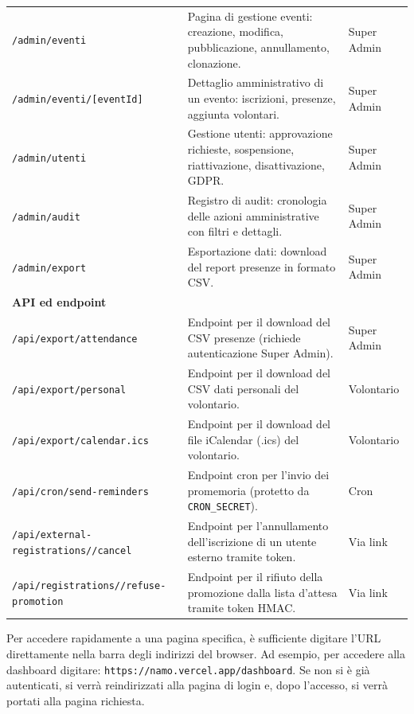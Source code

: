 \documentclass[a4paper,11pt,oneside]{book}
\newcommand{\percorso}[1]{\textcolor{namoCyan}{\texttt{#1}}}
\begin{document}
\begin{longtable}{l p{7cm} l}
\midrule
\percorso{/admin/eventi} & Pagina di gestione eventi: creazione, modifica, pubblicazione, annullamento, clonazione. & Super Admin \\[4pt]
\percorso{/admin/eventi/[eventId]} & Dettaglio amministrativo di un evento: iscrizioni, presenze, aggiunta volontari. & Super Admin \\[4pt]
\percorso{/admin/utenti} & Gestione utenti: approvazione richieste, sospensione, riattivazione, disattivazione, GDPR. & Super Admin \\[4pt]
\percorso{/admin/audit} & Registro di audit: cronologia delle azioni amministrative con filtri e dettagli. & Super Admin \\[4pt]
\percorso{/admin/export} & Esportazione dati: download del report presenze in formato CSV. & Super Admin \\[4pt]
\midrule
\multicolumn{3}{l}{\textbf{\textcolor{namoCyan}{API ed endpoint}}} \\
\midrule
\percorso{/api/export/attendance} & Endpoint per il download del CSV presenze (richiede autenticazione Super Admin). & Super Admin \\[4pt]
\percorso{/api/export/personal} & Endpoint per il download del CSV dati personali del volontario. & Volontario \\[4pt]
\percorso{/api/export/calendar.ics} & Endpoint per il download del file iCalendar (.ics) del volontario. & Volontario \\[4pt]
\percorso{/api/cron/send-reminders} & Endpoint cron per l'invio dei promemoria (protetto da \texttt{CRON\_SECRET}). & Cron \\[4pt]
\percorso{/api/external-registrations/\newline[cancelToken]/cancel} & Endpoint per l'annullamento dell'iscrizione di un utente esterno tramite token. & Via link \\[4pt]
\percorso{/api/registrations/\newline[registrationId]/refuse-promotion} & Endpoint per il rifiuto della promozione dalla lista d'attesa tramite token HMAC. & Via link \\
\bottomrule
\end{longtable}

\begin{tipbox}
Per accedere rapidamente a una pagina specifica, \`e sufficiente digitare l'URL direttamente nella barra degli indirizzi del browser. Ad esempio, per accedere alla dashboard digitare: \texttt{https://namo.vercel.app/dashboard}. Se non si \`e gi\`a autenticati, si verr\`a reindirizzati alla pagina di login e, dopo l'accesso, si verr\`a portati alla pagina richiesta.
\end{tipbox}
\end{document}
